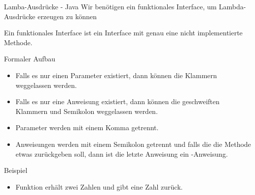 \documentclass{../tuda-beamer}
\begin{document}
  \begin{frame}
    
  \end{frame}

  \begin{frame}
    
  \end{frame}

  \begin{frame}{Lamba-Ausdrücke - Java}
    Wir benötigen ein funktionales Interface, um Lambda-Ausdrücke erzeugen zu können

    \begin{note}[title=Information:]
      Ein funktionales Interface ist ein Interface mit genau eine nicht implementierte Methode.
    \end{note}

    
  \end{frame}

  \begin{frame}{Formaler Aufbau}
    
    \begin{itemize}
      \item Falls es nur einen Parameter existiert, dann können die Klammern weggelassen werden.
      \item Falls es nur eine Anweisung existiert, dann können die geschweiften Klammern und
      Semikolon weggelassen werden.
      \item Parameter werden mit einem Komma getrennt.
      \item Anweisungen werden mit einem Semikolon getrennt und falls die die Methode etwas
      zurückgeben soll, dann ist die letzte Anweisung ein -Anweisung.
    \end{itemize}
  \end{frame}

  \begin{frame}{Beispiel}
    \begin{itemize}
      \item Funktion erhält zwei  Zahlen und gibt eine  Zahl zurück.
    \end{itemize}
    
  \end{frame}

  \begin{frame}
    
  \end{frame}
\end{document}
